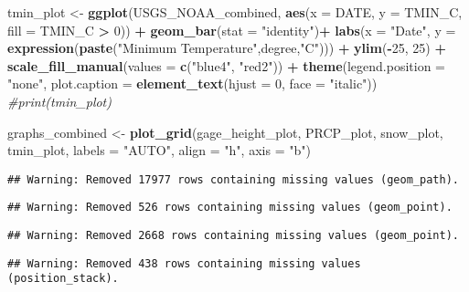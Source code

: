\documentclass[]{article}
\newenvironment{Shaded}{\begin{snugshade}}{\end{snugshade}}
\newcommand{\CommentTok}[1]{\textcolor[rgb]{0.56,0.35,0.01}{\textit{#1}}}
\newcommand{\DataTypeTok}[1]{\textcolor[rgb]{0.13,0.29,0.53}{#1}}
\newcommand{\DecValTok}[1]{\textcolor[rgb]{0.00,0.00,0.81}{#1}}
\newcommand{\KeywordTok}[1]{\textcolor[rgb]{0.13,0.29,0.53}{\textbf{#1}}}
\newcommand{\NormalTok}[1]{#1}
\newcommand{\OperatorTok}[1]{\textcolor[rgb]{0.81,0.36,0.00}{\textbf{#1}}}
\newcommand{\StringTok}[1]{\textcolor[rgb]{0.31,0.60,0.02}{#1}}
\begin{document}
\begin{Shaded}
\begin{Highlighting}[]
\NormalTok{tmin_plot <-}\StringTok{ }\KeywordTok{ggplot}\NormalTok{(USGS_NOAA_combined, }\KeywordTok{aes}\NormalTok{(}\DataTypeTok{x =}\NormalTok{ DATE, }\DataTypeTok{y =}\NormalTok{ TMIN_C, }\DataTypeTok{fill =}\NormalTok{ TMIN_C }\OperatorTok{>}\StringTok{ }\DecValTok{0}\NormalTok{)) }\OperatorTok{+}
\StringTok{  }\KeywordTok{geom_bar}\NormalTok{(}\DataTypeTok{stat =} \StringTok{"identity"}\NormalTok{)}\OperatorTok{+}
\StringTok{  }\KeywordTok{labs}\NormalTok{(}\DataTypeTok{x =} \StringTok{"Date"}\NormalTok{, }\DataTypeTok{y =} \KeywordTok{expression}\NormalTok{(}\KeywordTok{paste}\NormalTok{(}\StringTok{"Minimum Temperature"}\NormalTok{,degree,}\StringTok{"C"}\NormalTok{))) }\OperatorTok{+}
\StringTok{  }\KeywordTok{ylim}\NormalTok{(}\OperatorTok{-}\DecValTok{25}\NormalTok{, }\DecValTok{25}\NormalTok{) }\OperatorTok{+}
\StringTok{  }\KeywordTok{scale_fill_manual}\NormalTok{(}\DataTypeTok{values =} \KeywordTok{c}\NormalTok{(}\StringTok{"blue4"}\NormalTok{, }\StringTok{"red2"}\NormalTok{)) }\OperatorTok{+}
\StringTok{  }\KeywordTok{theme}\NormalTok{(}\DataTypeTok{legend.position =} \StringTok{"none"}\NormalTok{,}
        \DataTypeTok{plot.caption =} \KeywordTok{element_text}\NormalTok{(}\DataTypeTok{hjust =} \DecValTok{0}\NormalTok{, }\DataTypeTok{face =} \StringTok{"italic"}\NormalTok{))}
\CommentTok{#print(tmin_plot)}

\NormalTok{graphs_combined <-}\StringTok{ }\KeywordTok{plot_grid}\NormalTok{(gage_height_plot, PRCP_plot, snow_plot, tmin_plot, }
                             \DataTypeTok{labels =} \StringTok{"AUTO"}\NormalTok{,}
                             \DataTypeTok{align =} \StringTok{"h"}\NormalTok{,}
                             \DataTypeTok{axis =} \StringTok{"b"}\NormalTok{)}
\end{Highlighting}
\end{Shaded}

\begin{verbatim}
## Warning: Removed 17977 rows containing missing values (geom_path).
\end{verbatim}

\begin{verbatim}
## Warning: Removed 526 rows containing missing values (geom_point).
\end{verbatim}

\begin{verbatim}
## Warning: Removed 2668 rows containing missing values (geom_point).
\end{verbatim}

\begin{verbatim}
## Warning: Removed 438 rows containing missing values (position_stack).
\end{verbatim}
\end{document}

